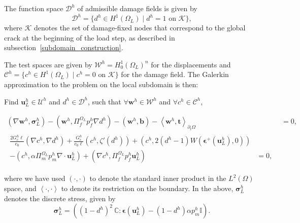The function space $\mathcal{D}^h$ of admissible damage fields is given by 
\begin{equation}\label{damage subspace}
    \mathcal{D}^h = \{ d^h \in H^1(\Omega_L) \mid d^h = 1 \text{ on } \mathcal{K} \},
\end{equation}
where $\mathcal{K}$ denotes the set of damage-fixed nodes that correspond to the global crack at the beginning of the load step, as described in subsection~\ref{subdomain_construction}. 

The test spaces are given by $\boldsymbol{\mathcal{W}}^h = H_0^1(\Omega_L)^n$ for the displacements and $\mathcal{C}^h = \{ c^h \in H^1(\Omega_L) \mid c^h = 0 \text{ on } \mathcal{K} \}$ for the damage field. The Galerkin approximation to the problem on the local subdomain is then:
\medskip

\begin{mdframed}[
    frametitle={The spatially discrete form},
    frametitlebackgroundcolor=gray!20,
    backgroundcolor=gray!5,
    linewidth=0pt,
    nobreak=true
  ]
  Find $\textbf{u}_L^h \in \boldsymbol{\mathcal{U}}^h$ and $d^h \in \mathcal{D}^h$, such that $\forall \textbf{w}^h \in \boldsymbol{\mathcal{W}}^h$ and $\forall c^h \in \mathcal{C}^h$,
 
 \begin{align}
  \left( \nabla \textbf{w}^h, \boldsymbol\sigma_L^h \right) - \left( \textbf{w}^h, \Pi^{\Omega_L}_f p_f^h \nabla d^h \right) - \left( \textbf{w}^h, \textbf{b} \right) - \left< \textbf{w}^h, \textbf{t} \right>_{\partial_t\Omega} &= 0, \label{eq: semidiscrete momentum balance}   \\
  \begin{split}
    \frac{2G_c^h\ell}{c_0}\left( \nabla c^h, \nabla d^h \right) + \frac{G_c^h}{c_0\ell}\left( c^h, \zeta'(d^h) \right) + \left( c^h, 2(d^h-1)W(\boldsymbol{\epsilon^+}(\textbf{u}_L^h),0) \right) \\
    - \left( c^h, \alpha \Pi^{\Omega_L}_m p_m^h\nabla \cdot \textbf{u}_L^h \right) + \left( \nabla c^h, \Pi^{\Omega_L}_f p_f^h\textbf{u}_L^h \right)  &= 0, \label{eq: semidiscrete damage evolution}    
  \end{split} 
\end{align}

\end{mdframed}
where we have used $(\cdot,\cdot)$ to denote the standard inner product in the $L^2(\Omega)$ space, and $\left< \cdot, \cdot \right>$ to denote its restriction on the boundary.   In the above,  $\boldsymbol\sigma^h_L$ denotes the discrete stress, given by 
\begin{equation}
    \boldsymbol\sigma^h_L = \left( (1-d^h)^2\ \mathbb{C}:\boldsymbol\epsilon(\textbf{u}_L^h) -(1-d^h)\alpha p_m^h \mathbb{I}\right).
\end{equation}

